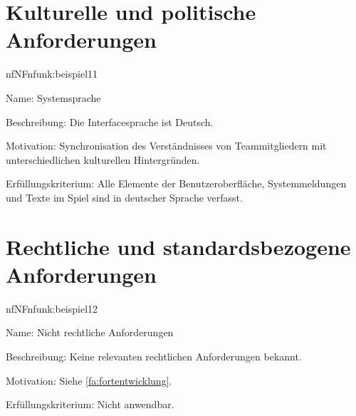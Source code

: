 \section{Kulturelle und politische Anforderungen}


\begin{description}[leftmargin=5em, style=sameline]	
	\begin{lhp}{nf}{NF}{nfunk:beispiel11}
		\item [Name:] Systemsprache
		\item [Beschreibung:] Die Interfacesprache ist Deutsch.
		\item [Motivation:] Synchronisation des Verständnisses von Teammitgliedern mit unterschiedlichen kulturellen Hintergründen.
		\item [Erfüllungskriterium:] Alle Elemente der Benutzeroberfläche, Systemmeldungen und Texte im Spiel sind in deutscher Sprache verfasst.
	\end{lhp}
\end{description}

\section{Rechtliche und standardsbezogene Anforderungen}


\begin{description}[leftmargin=5em, style=sameline]	
	\begin{lhp}{nf}{NF}{nfunk:beispiel12}
		\item [Name:] Nicht rechtliche Anforderungen
		\item [Beschreibung:] Keine relevanten rechtlichen Anforderungen bekannt.
		\item [Motivation:] Siehe \ref{fa:fortentwicklung}.
		\item [Erfüllungskriterium:] Nicht anwendbar.
	\end{lhp}
\end{description}
